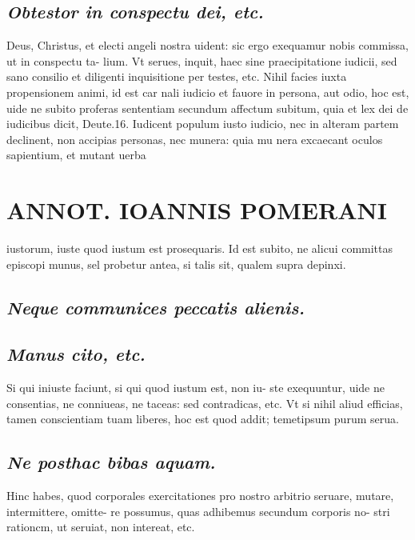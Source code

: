 \documentclass{article}
\begin{document}
\begin{pages}
\subsection*{\textit{Obtestor in conspectu dei, etc. }}\pstart Deus, Christus, et electi angeli nostra uident: sic ergo exequamur nobis commissa, ut in conspectu ta- lium. Vt serues, inquit, haec sine praecipitatione iudicii, sed sano consilio et diligenti inquisitione per testes, etc. Nihil facies iuxta propensionem animi, id est car nali iudicio et fauore in persona, aut odio, hoc est, uide ne subito proferas sententiam secundum affectum subitum, quia et lex dei de iudicibus dicit, Deute.16. Iudicent populum iusto iudicio, nec in alteram partem declinent, non accipias personas, nec munera: quia mu nera excaecant oculos sapientium, et mutant uerba  \pend
\section*{ANNOT. IOANNIS POMERANI }\pstart iustorum, iuste quod iustum est prosequaris.  \pend\pstart Id est subito, ne alicui committas episcopi munus, sel probetur antea, si talis sit, qualem supra depinxi.  \pend
{}
{}
\subsection*{\textit{Neque communices peccatis alienis. }}
{}
\subsection*{\textit{Manus cito, etc. }}\pstart Si qui iniuste faciunt, si qui quod iustum est, non iu- ste exequuntur, uide ne consentias, ne conniueas, ne taceas: sed contradicas, etc. Vt si nihil aliud efficias, tamen conscientiam tuam liberes, hoc est quod addit; temetipsum purum serua.  \pend
{}
{}
\subsection*{\textit{Ne posthac bibas aquam. }}\pstart Hinc habes, quod corporales exercitationes pro nostro arbitrio seruare, mutare, intermittere, omitte- re possumus, quas adhibemus secundum corporis no- stri rationcm, ut seruiat, non intereat, etc.  \pend
{}
{}

\end{pages}
\end{document}
